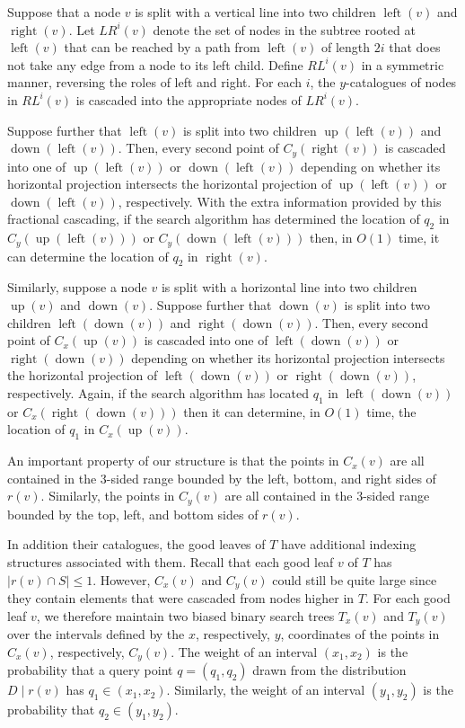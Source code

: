 \documentclass[lotsofwhite,charterfonts]{patmorin}
\DeclareMathOperator{\lft}{left}
\DeclareMathOperator{\rght}{right}
\DeclareMathOperator{\tp}{up}
\DeclareMathOperator{\bttm}{down}
\begin{document}
Suppose that a node $v$ is split with a vertical line into two
children $\lft(v)$ and $\rght(v)$.  Let $LR^i(v)$ denote the set of
nodes in the subtree rooted at $\lft(v)$ that can be reached by a path
from $\lft(v)$ of length $2i$ that does not take any edge from a node
to its left child.  Define $RL^i(v)$ in a symmetric manner, reversing
the roles of left and right. For each $i$, the $y$-catalogues of nodes
in $RL^i(v)$ is cascaded into the appropriate nodes of 
$LR^i(v)$. 

  Suppose
further that $\lft(v)$ is split into two children $\tp(\lft(v))$ and
$\bttm(\lft(v))$.  Then, every second point of $C_y(\rght(v))$ is
cascaded into one of $\tp(\lft(v))$ or $\bttm(\lft(v))$ depending on
whether its horizontal projection intersects the horizontal projection
of $\tp(\lft(v))$ or $\bttm(\lft(v))$, respectively.  With the extra
information provided by this fractional cascading, if the search
algorithm has determined the location of $q_2$ in $C_y(\tp(\lft(v)))$
or $C_y(\bttm(\lft(v)))$ then, in $O(1)$ time, it can determine the
location of $q_2$ in $\rght(v)$.

Similarly, suppose a node $v$ is split with a horizontal line into two
children $\tp(v)$ and $\bttm(v)$.  Suppose further that $\bttm(v)$ is
split into two children $\lft(\bttm(v))$ and $\rght(\bttm(v))$.  Then,
every second point of $C_x(\tp(v))$ is cascaded into one of
$\lft(\bttm(v))$ or $\rght(\bttm(v))$ depending on whether its
horizontal projection intersects the horizontal projection of
$\lft(\bttm(v))$ or $\rght(\bttm(v))$, respectively.  Again, if the
search algorithm has located $q_1$ in $\lft(\bttm(v))$ or
$C_x(\rght(\bttm(v)))$ then it can determine, in $O(1)$ time, the location
of $q_1$ in $C_x(\tp(v))$.

An important property of our structure is that the points in $C_x(v)$
are all contained in the 3-sided range bounded by the left, bottom,
and right sides of $r(v)$.  Similarly, the points in $C_y(v)$ are all
contained in the 3-sided range bounded by the top, left, and bottom
sides of $r(v)$.

In addition their catalogues, the good leaves of $T$ have additional
indexing structures associated with them.  Recall that each good leaf
$v$ of $T$ has $|r(v)\cap S| \le 1$. However, $C_x(v)$ and $C_y(v)$
could still be quite large since they contain elements that were
cascaded from nodes higher in $T$.  For each good leaf $v$, we
therefore maintain two biased binary search trees $T_x(v)$ and
$T_y(v)$ over the intervals defined by the $x$, respectively, $y$,
coordinates of the points in $C_x(v)$, respectively, $C_y(v)$.  The
weight of an interval $(x_1,x_2)$ is the probability that a query
point $q=(q_1,q_2)$ drawn from the distribution $D\mid r(v)$ has
$q_1\in(x_1,x_2)$.   Similarly, the weight of an interval $(y_1,y_2)$
is the probability that $q_2\in (y_1,y_2)$.
\end{document}
